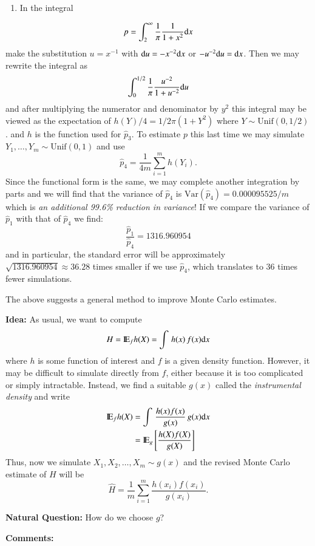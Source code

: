 \documentclass[captions=tableheading]{scrbook}
\begin{document}
\begin{enumerate}
\item In the integral
\end{enumerate}
\[
p=\int_{2}^{\infty}\frac{1}{\pi}\frac{1}{1+x^{2}}\mathrm{d} x
\]
make the substitution $u=x^{-1}$ with $\mathrm{d} u=-x^{-2}\mathrm{d} x$ or $-u^{-2}\mathrm{d} u=\mathrm{d} x$.
Then we may rewrite the integral as 
\[
\int_{0}^{1/2}\frac{1}{\pi}\frac{u^{-2}}{1+u^{-2}}\mathrm{d} u
\]
and after multiplying the numerator and denominator by $y^{2}$ this integral may be viewed as the expectation of $h(Y)/4=1/2\pi(1+Y^{2})$ where $Y\sim\mathrm{Unif}(0,1/2)$. and $h$ is the function used for $\hat{p}_{3}$. To estimate $p$ this last time we may simulate $Y_{1},\ldots,Y_{m}\sim\mathrm{Unif}(0,1)$ and use 
\[
\hat{p}_{4} = \frac{1}{4m}\sum_{i=1}^{m} h(Y_{i}).
\]
Since the functional form is the same, we may complete another integration by parts and we will find that the variance of $\hat{p}_{4}$ is $\mbox{Var}(\hat{p}_{4})=0.000095525/m$ which is \emph{an additional 99.6\% reduction in variance}! If we compare the variance of $\hat{p}_{1}$ with that of $\hat{p}_{4}$
we find: 
\[
\frac{\hat{p}_{1}}{\hat{p}_{4}}=1316.960954
\]
and in particular, the standard error will be approximately $\sqrt{1316.960954}\approx 36.28$ times smaller if we use $\hat{p}_{4}$, which translates to 36 times fewer simulations. 

 
The above suggests a general method to improve Monte Carlo estimates.

\textbf{Idea:} As usual, we want to compute 
\[
H = \mathrm{I\hspace{-1.5pt}E}_{f}h(X) = \int\, h(x)\, f(x)\mathrm{d} x
\]
where $h$ is some function of interest and $f$ is a given density function. However, it may be difficult to simulate directly from $f$, either because it is too complicated or simply intractable. Instead, we find a suitable $g(x)$ called the \emph{instrumental density} and write 
\begin{align*}
\mathrm{I\hspace{-1.5pt}E}_{f}h(X) & =\int\,\frac{h(x)f(x)}{g(x)}\, g(x)\mathrm{d} x\\
 & =\mathrm{I\hspace{-1.5pt}E}_{g}\left[\frac{h(X)f(X)}{g(X)}\right]
\end{align*}
Thus, now we simulate \(X_{1},X_{2},\ldots,X_{m}\sim g(x)\) and the revised Monte Carlo estimate of $H$ will be 
\[
\hat{H} = \frac{1}{m}\sum_{i=1}^{m}\frac{h(x_{i})f(x_{i})}{g(x_{i})}.
\]


\textbf{Natural Question:} How do we choose $g$?

\textbf{Comments:}
\end{document}
